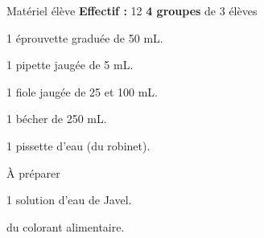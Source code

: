 
\begin{boiteMateriel}{Matériel élève}
  \textbf{Effectif :} 12
  \qq{}\qq{}
  \flecheLongue \textbf{4 groupes} de 3 élèves

  \begin{protocole}
    \item 1 éprouvette graduée de 50 mL.
    \item 1 pipette jaugée de 5 mL.
    \item 1 fiole jaugée de 25 et 100 mL.
    \item 1 bécher de 250 mL.
    \item 1 pissette d'eau (du robinet).
  \end{protocole}
\end{boiteMateriel}


\begin{boiteMateriel}{À préparer}
  \begin{protocole}
    \item 1 solution d'eau de Javel.
    \item du colorant alimentaire.
  \end{protocole}
\end{boiteMateriel}
